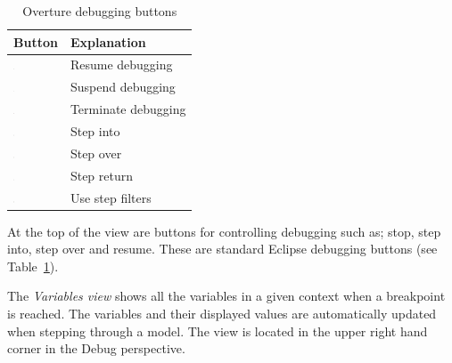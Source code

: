 \begin{table}
\begin{center}
\begin{tabular}{|l|l|}\hline \hline
\textbf{Button} & \textbf{Explanation} \\ \hline
\includegraphics[width=0.03\textwidth]{figures/resume} & Resume debugging \\
\includegraphics[width=0.03\textwidth]{figures/suspend} & Suspend debugging\\
\includegraphics[width=0.03\textwidth]{figures/terminate} & Terminate debugging\\
\includegraphics[width=0.03\textwidth]{figures/stepinto} & Step into\\
\includegraphics[width=0.03\textwidth]{figures/stepover} & Step over \\
\includegraphics[width=0.03\textwidth]{figures/stepreturn} & Step return\\
\includegraphics[width=0.03\textwidth]{figures/stepbystep} & Use step filters\\
\hline \hline
\end{tabular}
\caption{Overture debugging buttons\label{tab:debugButtons}}
\end{center}
\end{table}

At the top of the view are buttons for controlling debugging such as;
stop, step into, step over and resume. These are standard Eclipse
debugging buttons (see Table~\ref{tab:debugButtons}).

The \emph{Variables view} shows all the variables in a given context
when a breakpoint is reached. The variables and their displayed values
are automatically updated when stepping through a model. The view is
located in the upper right hand corner in the Debug perspective.


